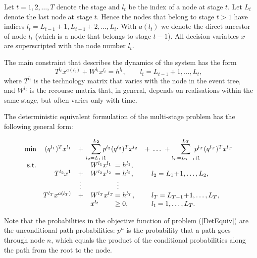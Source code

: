 Let $t = 1,2,\ldots,T$ denote the stage and $l_t$ be the index of a 
node at stage $t$.
Let $L_t$ denote the last node at stage $t$. Hence 
the nodes that belong to stage $t > 1$ have indices 
$l_t = L_{t-1} \! + \! 1, L_{t-1} \! + \! 2, \dots, L_t$. 
With $a(l_t)$ we denote the direct ancestor of node $l_t$ (which is a 
node that belongs to stage $t-1$).
All decision variables $x$ are superscripted with the node number 
$l_t$.

The main constraint that describes the dynamics of the system has the form 
\[
  T^{l_t}x^{a(l_t)} +W^{l_t}x^{l_t} =h^{l_t}, \qquad l_t =L_{t-1}+1,\dots,L_t,
\]
%
where $T^{l_t}$ is the technology matrix that varies 
with the node in the event tree, and $W^{l_t}$ is the recourse
matrix that, in general, depends on realisations within the same stage,
but often varies only with time.

The deterministic equivalent formulation of the multi-stage 
problem has the following general form:

\begin{equation}
  \begin{array}{rrclll}
    \min & (q^{l_1})^T x^{l_1} & + & \!\!\!\!{\displaystyle \sum_{l_2=L_1 \!+\! 1}^{L_2}} \!\!\! p^{l_2} (q^{l_2})^T x^{l_2} && \!\!\!\!\!\!  + \; \ldots \; + {\displaystyle \sum_{l_T = L_{T-1} \! + \! 1}^{L_T}} \!\!\!\!\! p^{l_T} (q^{l_T})^T x^{l_T} \\
    \mbox{s.t.} & & & W^{l_1} x^{l_1} & \hspace{-1.5cm} = h^{l_1}, \\
    & T^{l_2} x^1 & + & W^{l_2} x^{l_2} & \hspace{-1.5cm} = h^{l_2}, & l_2 = L_1 \!+\! 1,\dots,L_2, \\
    & & \vdots & & \hspace{-1.4cm} \vdots \\
    & T^{l_T} x^{a(l_T)} & + &  W^{l_T} x^{l_T} & \hspace{-1.5cm} = h^{l_T}, & l_T = L_{T-1} \! + \! 1, \dots, L_T, \\
    & & & x^{l_t} & \hspace{-1.5cm} \geq 0, & l_t = 1,\dots, L_{T}. \\
    \label{DetEquiv}
  \end{array} 
\end{equation}

Note that the probabilities in the objective function of problem 
(\ref{DetEquiv}) are the unconditional path probabilities: $p^n$ is 
the probability that a path goes through node $n$, which equals the 
product of the conditional probabilities along the path from the root 
to the node.

